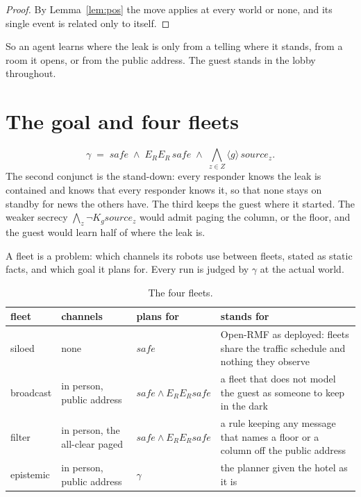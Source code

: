 \documentclass[11pt,a4paper]{article}
\theoremstyle{definition}
\newcommand{\safe}{\mathit{safe}}
\newcommand{\src}[1]{\mathit{source}_{#1}}
\begin{document}
\begin{proof}
By Lemma~\ref{lem:pos} the move applies at every world or none, and its single
event is related only to itself.
\end{proof}

\noindent
So an agent learns where the leak is only from a telling where it stands, from
a room it opens, or from the public address. The guest stands in the lobby
throughout.

\section{The goal and four fleets}
\label{sec:goal}

\[
  \gamma \;=\; \safe \;\wedge\; E_R E_R\,\safe \;\wedge\;
  \bigwedge_{z \in Z} \langle g\rangle\,\src{z}.
\]
The second conjunct is the stand-down: every responder knows the leak is
contained and knows that every responder knows it, so that none stays on
standby for news the others have. The third keeps the guest where it started.
The weaker secrecy $\bigwedge_z \neg K_g\src{z}$ would admit paging the column,
or the floor, and the guest would learn half of where the leak is.

A fleet is a problem: which channels its robots use between fleets, stated as
static facts, and which goal it plans for. Every run is judged by $\gamma$ at
the actual world.

\begin{table}[H]
\centering\small
\begin{tabularx}{\textwidth}{@{}l l l X@{}}
\toprule
fleet & channels & plans for & stands for \\
\midrule
siloed & none & $\safe$ & Open-RMF as deployed: fleets share the traffic schedule and nothing they observe \\
broadcast & in person, public address & $\safe \wedge E_RE_R\safe$ & a fleet that does not model the guest as someone to keep in the dark \\
filter & in person, the all-clear paged & $\safe \wedge E_RE_R\safe$ & a rule keeping any message that names a floor or a column off the public address \\
epistemic & in person, public address & $\gamma$ & the planner given the hotel as it is \\
\bottomrule
\end{tabularx}
\caption{The four fleets.}
\label{tab:fleets}
\end{table}
\end{document}
